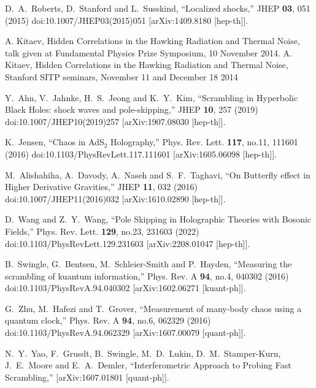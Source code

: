 \documentclass[preprintnumbers,aps,prd,longbibliography,nofootinbib,nobibnotes,amsmath,amssymb]{revtex4}
\begin{document}
\begin{thebibliography}{99}
D.~A.~Roberts, D.~Stanford and L.~Susskind,
``Localized shocks,''
JHEP \textbf{03}, 051 (2015)
doi:10.1007/JHEP03(2015)051
[arXiv:1409.8180 [hep-th]].

A. Kitaev, Hidden Correlations in the Hawking Radiation and Thermal Noise, talk given at Fundamental Physics Prize Symposium, 10 November 2014.
A. Kitaev, Hidden Correlations in the Hawking Radiation and Thermal Noise, Stanford SITP seminars, November 11 and December 18 2014


Y.~Ahn, V.~Jahnke, H.~S.~Jeong and K.~Y.~Kim,
``Scrambling in Hyperbolic Black Holes: shock waves and pole-skipping,''
JHEP \textbf{10}, 257 (2019)
doi:10.1007/JHEP10(2019)257
[arXiv:1907.08030 [hep-th]].

K.~Jensen,
``Chaos in AdS$_2$ Holography,''
Phys. Rev. Lett. \textbf{117}, no.11, 111601 (2016)
doi:10.1103/PhysRevLett.117.111601
[arXiv:1605.06098 [hep-th]].

M.~Alishahiha, A.~Davody, A.~Naseh and S.~F.~Taghavi,
``On Butterfly effect in Higher Derivative Gravities,''
JHEP \textbf{11}, 032 (2016)
doi:10.1007/JHEP11(2016)032
[arXiv:1610.02890 [hep-th]].

D.~Wang and Z.~Y.~Wang,
``Pole Skipping in Holographic Theories with Bosonic Fields,''
Phys. Rev. Lett. \textbf{129}, no.23, 231603 (2022)
doi:10.1103/PhysRevLett.129.231603
[arXiv:2208.01047 [hep-th]].

B.~Swingle, G.~Bentsen, M.~Schleier-Smith and P.~Hayden,
``Measuring the scrambling of kuantum information,''
Phys. Rev. A \textbf{94}, no.4, 040302 (2016)
doi:10.1103/PhysRevA.94.040302
[arXiv:1602.06271 [kuant-ph]].

G.~Zhu, M.~Hafezi and T.~Grover,
``Measurement of many-body chaos using a quantum clock,''
Phys. Rev. A \textbf{94}, no.6, 062329 (2016)
doi:10.1103/PhysRevA.94.062329
[arXiv:1607.00079 [quant-ph]].

N.~Y.~Yao, F.~Grusdt, B.~Swingle, M.~D.~Lukin, D.~M.~Stamper-Kurn, J.~E.~Moore and E.~A.~Demler,
``Interferometric Approach to Probing Fast Scrambling,''
[arXiv:1607.01801 [quant-ph]].


\end{thebibliography}
\end{document}
